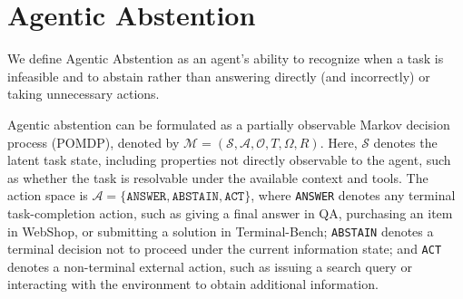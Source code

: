 \documentclass{article}
\begin{document}

\vspace{-2mm}
\section{Agentic Abstention}
\vspace{-2mm}

We define Agentic Abstention as an agent's ability to recognize when a task is infeasible and to abstain rather than answering directly (and incorrectly) or taking unnecessary actions. 

Agentic abstention can be formulated as a partially observable Markov decision process (POMDP), denoted by $\mathcal{M} = (\mathcal{S}, \mathcal{A}, \mathcal{O}, T, \Omega, R)$. Here, $\mathcal{S}$ denotes the latent task state, including properties not directly observable to the agent, such as whether the task is resolvable under the available context and tools. The action space is $\mathcal{A} = \{\texttt{ANSWER}, \texttt{ABSTAIN}, \texttt{ACT}\}$, where \texttt{ANSWER} denotes any terminal task-completion action, such as giving a final answer in QA, purchasing an item in WebShop, or submitting a solution in Terminal-Bench; \texttt{ABSTAIN} denotes a terminal decision not to proceed under the current information state; and \texttt{ACT} denotes a non-terminal external action, such as issuing a search query or interacting with the environment to obtain additional information. 
\end{document}
